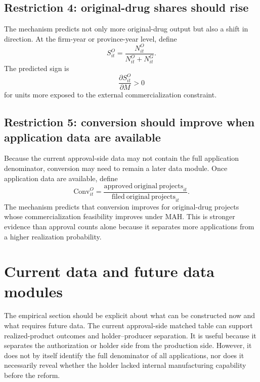 \documentclass[12pt]{article}
\newcommand{\Conv}{\mathrm{Conv}}
\begin{document}
\subsection{Restriction 4: original-drug shares should rise}

The mechanism predicts not only more original-drug output but also a shift in direction. At the firm-year or province-year level, define
\[
S_{it}^O=\frac{N_{it}^O}{N_{it}^O+N_{it}^G}.
\]
The predicted sign is
\[
\frac{\partial S_{it}^O}{\partial M}>0
\]
for units more exposed to the external commercialization constraint.

\subsection{Restriction 5: conversion should improve when application data are available}

Because the current approval-side data may not contain the full application denominator, conversion may need to remain a later data module. Once application data are available, define
\[
\Conv_{it}^O=\frac{\mathrm{approved\ original\ projects}_{it}}{\mathrm{filed\ original\ projects}_{it}}.
\]
The mechanism predicts that conversion improves for original-drug projects whose commercialization feasibility improves under MAH. This is stronger evidence than approval counts alone because it separates more applications from a higher realization probability.

\section{Current data and future data modules}

The empirical section should be explicit about what can be constructed now and what requires future data. The current approval-side matched table can support realized-product outcomes and holder--producer separation. It is useful because it separates the authorization or holder side from the production side. However, it does not by itself identify the full denominator of all applications, nor does it necessarily reveal whether the holder lacked internal manufacturing capability before the reform.
\end{document}
